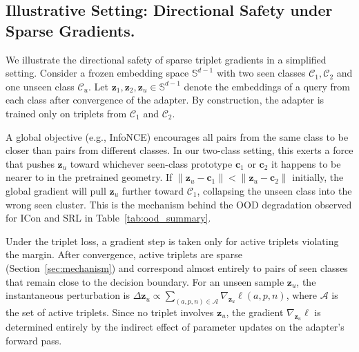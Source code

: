 \documentclass{article}
\begin{document}
\subsection{Illustrative Setting: Directional Safety under Sparse Gradients.}

We illustrate the directional safety of sparse triplet gradients in a simplified setting.
Consider a frozen embedding space $\mathbb{S}^{d-1}$ with two seen classes $\mathcal{C}_1, \mathcal{C}_2$ and one unseen class $\mathcal{C}_u$.
Let $\mathbf{z}_1, \mathbf{z}_2, \mathbf{z}_u \in \mathbb{S}^{d-1}$ denote the embeddings of a query from each class after convergence of the adapter.
By construction, the adapter is trained only on triplets from $\mathcal{C}_1$ and $\mathcal{C}_2$.

A global objective (e.g., InfoNCE) encourages all pairs from the same class to be closer than pairs from different classes.
In our two-class setting, this exerts a force that pushes $\mathbf{z}_u$ toward whichever seen-class prototype $\mathbf{c}_1$ or $\mathbf{c}_2$ it happens to be nearer to in the pretrained geometry.
If $\|\mathbf{z}_u - \mathbf{c}_1\| < \|\mathbf{z}_u - \mathbf{c}_2\|$ initially, the global gradient will pull $\mathbf{z}_u$ further toward $\mathcal{C}_1$, collapsing the unseen class into the wrong seen cluster.
This is the mechanism behind the OOD degradation observed for ICon and SRL in Table~\ref{tab:ood_summary}.

Under the triplet loss, a gradient step is taken only for active triplets violating the margin.
After convergence, active triplets are sparse (Section~\ref{sec:mechanism}) and correspond almost entirely to pairs of seen classes that remain close to the decision boundary.
For an unseen sample $\mathbf{z}_u$, the instantaneous perturbation is $\Delta \mathbf{z}_u \propto \sum_{(a,p,n) \in \mathcal{A}} \nabla_{\mathbf{z}_u} \ell(a,p,n)$, where $\mathcal{A}$ is the set of active triplets.
Since no triplet involves $\mathbf{z}_u$, the gradient $\nabla_{\mathbf{z}_u} \ell$ is determined entirely by the indirect effect of parameter updates on the adapter's forward pass.
\end{document}
